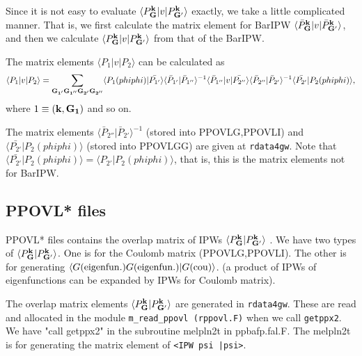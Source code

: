 \documentclass[a4paper,10pt,epsf,fleqn]{article}
\newcommand{\bfk}{{\bf k}}
\newcommand{\bfG}{{\bf G}}
\newcommand{\io}[1]{{\sf  #1}}
\begin{document}
Since it is not easy to evaluate 
$\langle P^\bfk_\bfG |v| P^\bfk_{\bfG'} \rangle$ exactly,
we take a little complicated manner.
That is, we first calculate the matrix element for BarIPW
$\langle \bar{P}^\bfk_\bfG |v| \bar{P}^\bfk_{\bfG'} \rangle$,
and then we calculate $\langle P^\bfk_\bfG |v| P^\bfk_{\bfG'} \rangle$
from that of the BarIPW.

The matrix elements $\langle P_1 |v| P_2 \rangle$ 
can be calculated as
\begin{eqnarray}
\langle P_1 |v| P_2 \rangle = 
\sum_{\bf G_{1'} G_{1''} G_{2'} G_{2''}} 
\langle P_1(phiphi) | \bar{P_{1'}} \rangle  
\langle \bar{P}_{1'}| \bar{P}_{1''} \rangle^{-1} 
\langle \bar{P}_{1''} |v| \bar{P_{2''}} \rangle  
\langle \bar{P}_{2''}| \bar{P}_{2'} \rangle^{-1} 
\langle \bar{P_{2'}} | P_2(phiphi) \rangle,  
\label{eq:pvp}
\end{eqnarray}
where $1\equiv ({\bf k},{\bf G_1})$ and so on.

The matrix elements
$\langle \bar{P}_{2''}| \bar{P}_{2'} \rangle^{-1}$ 
(stored into \io{PPOVLG,PPOVLI})
and $\langle \bar{P_{2'}} | P_2(phiphi) \rangle$ 
(stored into \io{PPOVLGG})
are given at {\tt rdata4gw}.
Note that $\langle \bar{P_{2'}} | P_2(phiphi) \rangle
=\langle P_{2'} | P_2(phiphi) \rangle$, that is, this is 
the matrix elements not for BarIPW.

\subsection{PPOVL* files}
\io{PPOVL*} files contains the 
overlap matrix of IPWs 
$\langle {P}^{\bf k}_{{\bf G}}|{P}^{\bf k}_{{\bf G'}}\rangle$
.
We have two types of $\langle {P}^{\bf k}_{{\bf G}}|{P}^{\bf k}_{{\bf G'}}\rangle$.
One is for the Coulomb matrix (PPOVLG,PPOVLI).
The other is for generating 
$\langle G({\rm eigenfun.}) G({\rm eigenfun.})| G({\rm cou}) \rangle$.  
(a product of IPWs of eigenfunctions can be
expanded by IPWs for Coulomb matrix).

The overlap matrix elements 
$\langle {P}^{\bf k}_{{\bf G}}|{P}^{\bf k}_{{\bf G'}}\rangle$ 
are generated in \verb!rdata4gw!.
These are read and allocated in the module 
\verb!m_read_ppovl (rppovl.F)! when we call 
\verb!getppx2!. We have "call getppx2" in the
subroutine melpln2t in ppbafp.fal.F.
The melpln2t is for generating the matrix element of
\verb!<IPW psi |psi>!.
\end{document}
